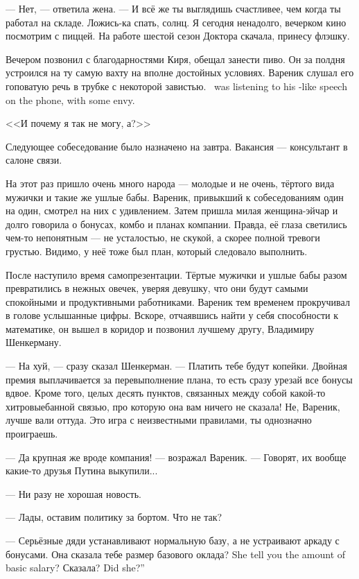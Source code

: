 --- Нет, --- ответила жена.
--- И всё же ты выглядишь счастливее, чем когда ты работал на складе.
Ложись-ка спать, солнц.
Я сегодня ненадолго, вечерком кино посмотрим с пиццей.
На работе шестой сезон Доктора скачала, принесу флэшку.

Вечером позвонил с благодарностями Киря, обещал занести пиво.
Он за полдня устроился на ту самую вахту на вполне достойных условиях.
{Вареник слушал его гоповатую речь в трубке с некоторой завистью.}
{\Varenik\ was listening to his \gopnik-like speech on the phone, with some envy.}

<<И почему я так не могу, а?>>

\asterism

Следующее собеседование было назначено на завтра.
Вакансия --- консультант в салоне связи.

На этот раз пришло очень много народа --- молодые и не очень, тёртого вида мужички и такие же ушлые бабы.
Вареник, привыкший к собеседованиям один на один, смотрел на них с удивлением.
Затем пришла милая женщина-эйчар и долго говорила о бонусах, комбо и планах компании.
Правда, её глаза светились чем-то непонятным --- не усталостью, не скукой, а скорее полной тревоги грустью.
Видимо, у неё тоже был план, который следовало выполнить.

После наступило время самопрезентации.
Тёртые мужички и ушлые бабы разом превратились в нежных овечек, уверяя девушку, что они будут самыми спокойными и продуктивными работниками.
Вареник тем временем прокручивал в голове услышанные цифры.
Вскоре, отчаявшись найти у себя способности к математике, он вышел в коридор и позвонил лучшему другу, Владимиру Шенкерману.

--- На хуй, --- сразу сказал Шенкерман.
--- Платить тебе будут копейки.
Двойная премия выплачивается за перевыполнение плана, то есть сразу урезай все бонусы вдвое.
Кроме того, целых десять пунктов, связанных между собой какой-то хитровыебанной связью, про которую она вам ничего не сказала!
Не, Вареник, лучше вали оттуда.
Это игра с неизвестными правилами, ты однозначно проиграешь.

--- Да крупная же вроде компания! --- возражал Вареник.
--- Говорят, их вообще какие-то друзья Путина выкупили...

--- Ни разу не хорошая новость.

--- Лады, оставим политику за бортом.
Что не так?

--- Серьёзные дяди устанавливают нормальную базу, а не устраивают аркаду с бонусами.
{Она сказала тебе размер базового оклада?}
{She tell you the amount of basic salary?}
{Сказала?}
{Did she?''}


